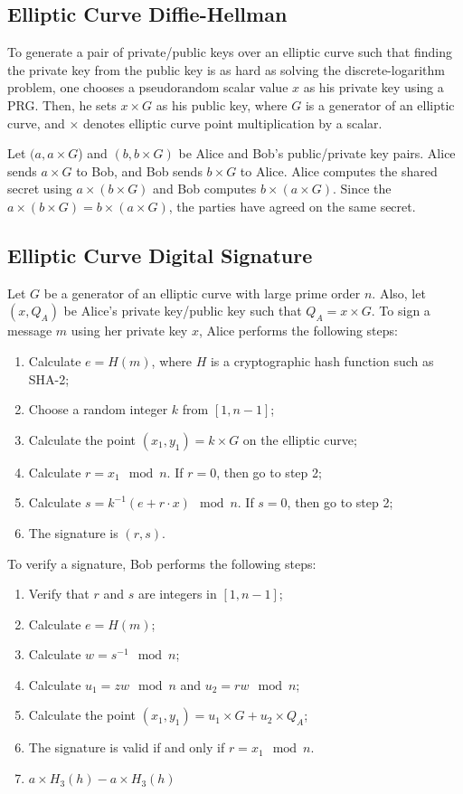 \documentclass[10pt]{article}
\theoremstyle{plain}
\begin{document}
\subsection{Elliptic Curve Diffie-Hellman}

To generate a pair of private/public keys over an elliptic curve such
that finding the private key from the public key is as hard as solving
the discrete-logarithm problem, one chooses a pseudorandom scalar
value $x$ as his private key using a PRG. Then, he sets $x\times G$
as his public key, where $G$ is a generator of an elliptic curve,
and $\times$ denotes elliptic curve point multiplication by a scalar.

Let $(a,a\times G$) and $(b,b\times G)$ be Alice and Bob's public/private
key pairs. Alice sends $a\times G$ to Bob, and Bob sends $b\times G$
to Alice. Alice computes the shared secret using $a\times(b\times G)$
and Bob computes $b\times(a\times G)$. Since the $a\times(b\times G)=b\times(a\times G)$,
the parties have agreed on the same secret.

\subsection{Elliptic Curve Digital Signature}

Let $G$ be a generator of an elliptic curve with large prime order
$n$. Also, let $(x,Q_{A})$ be Alice's private key/public key such
that $Q_{A}=x\times G$. To sign a message $m$ using her private
key $x$, Alice performs the following steps:
\begin{enumerate}
	\item Calculate $e=H(m)$, where $H$ is a cryptographic hash function such
	as SHA-2;
	\item Choose a random integer $k$ from $[1,n-1]$;
	\item Calculate the point $(x_{1},y_{1})=k\times G$ on the elliptic curve;
	\item Calculate $r=x_{1}\mod n$. If $r=0$, then go to step 2;
	\item Calculate $s=k^{-1}(e+r\cdot x)\mod n$. If $s=0$, then go to step
	2;
	\item The signature is $(r,s)$.
\end{enumerate}
To verify a signature, Bob performs the following steps:
\begin{enumerate}
	\item Verify that $r$ and $s$ are integers in $[1,n-1]$;
	\item Calculate $e=H(m)$;
	\item Calculate $w=s^{-1}\mod n$;
	\item Calculate $u_{1}=zw\mod n$ and $u_{2}=rw\mod n$;
	\item Calculate the point $(x_{1},y_{1})=u_{1}\times G+u_{2}\times Q_{A}$;
	\item The signature is valid if and only if $r=x_{1}\mod n$.
	\item $a\times H_{3}(h)-a\times H_{3}(h)$
\end{enumerate}
\end{document}
